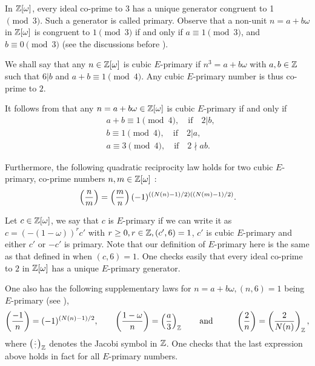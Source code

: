 \documentclass[twoside,leqno,10pt, A4]{amsart}
\begin{document}
In $\mathbb{Z}[\omega]$, every ideal co-prime to $3$ has a unique generator congruent to 1  $\pmod 3$.  Such a generator is
called primary.  Observe that a non-unit
$n=a+b\omega$ in $\mathbb Z[\omega]$ is congruent to $1
\pmod{3}$ if and only if $a \equiv 1 \pmod{3}$, and $b \equiv
0 \pmod{3}$ (see the discussions before \cite[Proposition 9.3.5]{I&R}). \newline

  We shall say that any $n \in \mathbb Z[\omega]$ is cubic $E$-primary if $n^3=a+b\omega$ with $a, b \in \mathbb Z$ such that $6 | b$ and $a+b \equiv 1 \pmod 4$. Any cubic $E$-primary number is thus co-prime to $2$. \newline

    It follows from \cite[Lemma 7.9]{Lemmermeyer} that any $n=a+b\omega \in \mathbb Z[\omega]$ is cubic $E$-primary if and only if
\begin{align}
\label{cubicE}
   & a+b \equiv 1 \pmod 4, \quad  \text{if} \quad 2 | b,  \\
   & b \equiv 1 \pmod 4, \quad  \text{if} \quad 2 | a,  \nonumber \\
   & a \equiv 3 \pmod 4, \quad  \text{if} \quad 2 \nmid ab.  \nonumber
\end{align}

     Furthermore, the following quadratic reciprocity law holds for two cubic $E$-primary, co-prime numbers $n, m \in \mathbb Z[\omega]$ :
\begin{align}
\label{quadreciQw}
    \left(\frac{n}{m}\right) =\left(\frac{m}{n}\right)(-1)^{((N(n)-1)/2)((N(m)-1)/2)}.
\end{align}

  Let $c \in \mathbb Z[\omega]$, we say that $c$ is $E$-primary if we can write it as $c=(-(1-\omega))^rc'$ with $r \geq 0, r \in \mathbb Z, (c', 6)=1$, $c'$ is cubic $E$-primary and either $c'$ or $-c'$ is primary. Note that our definition of $E$-primary here is the same as that defined in \cite[Section 7.3]{Lemmermeyer} when $(c,6)=1$. One checks easily that every ideal co-prime to $2$ in $\mathbb{Z}[\omega]$ has a unique $E$-primary generator. \newline

  One also has the following supplementary laws for $n=a+b\omega, (n,6)=1$ being $E$-primary (see \cite[Theorem 7.10]{Lemmermeyer}),
\begin{align}
\label{2.05}
  \left(\frac{-1}{n}\right)=(-1)^{(N(n)-1)/2}, \qquad \left(\frac{1-\omega}{n}\right)=\left(\frac{a}{3}\right)_{\mathbb Z} \qquad \mbox{and} \qquad  \hspace{0.1in} \left(\frac{2}{n}\right)=\left(\frac{2}{N(n)}\right)_{\mathbb Z},
\end{align}
   where $\left(\frac{\cdot}{\cdot}\right)_{\mathbb Z}$ denotes the Jacobi symbol in $\mathbb Z$. One checks that the last expression above holds in fact for all $E$-primary numbers. \newline
\end{document}
